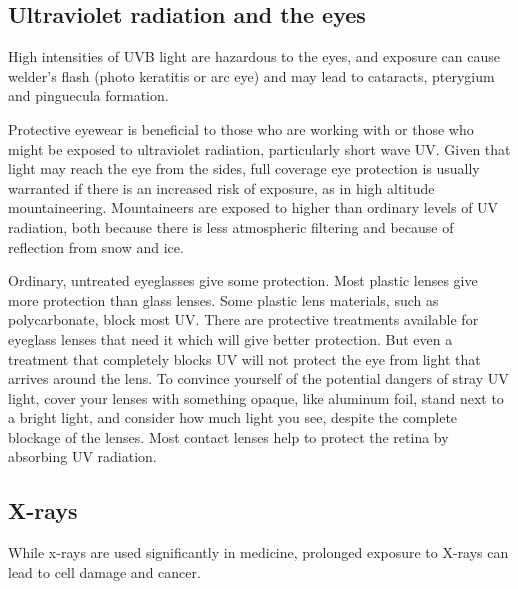 
\subsection{Ultraviolet radiation and the eyes}
High intensities of UVB light are hazardous to the eyes, and exposure can cause welder's flash (photo keratitis or arc eye) and may lead to cataracts, pterygium and pinguecula formation.

Protective eyewear is beneficial to those who are working with or those who might be exposed to ultraviolet radiation, particularly short wave UV. Given that light may reach the eye from the sides, full coverage eye protection is usually warranted if there is an increased risk of exposure, as in high altitude mountaineering. Mountaineers are exposed to higher than ordinary levels of UV radiation, both because there is less atmospheric filtering and because of reflection from snow and ice.

Ordinary, untreated eyeglasses give some protection. Most plastic lenses give more protection than glass lenses. Some plastic lens materials, such as polycarbonate, block most UV. There are protective treatments available for eyeglass lenses that need it which will give better protection. But even a treatment that completely blocks UV will not protect the eye from light that arrives around the lens. To convince yourself of the potential dangers of stray UV light, cover your lenses with something opaque, like aluminum foil, stand next to a bright light, and consider how much light you see, despite the complete blockage of the lenses. Most contact lenses help to protect the retina by absorbing UV radiation.

\subsection{X-rays}
While x-rays are used significantly in medicine, prolonged exposure to X-rays can lead to cell damage and cancer.

